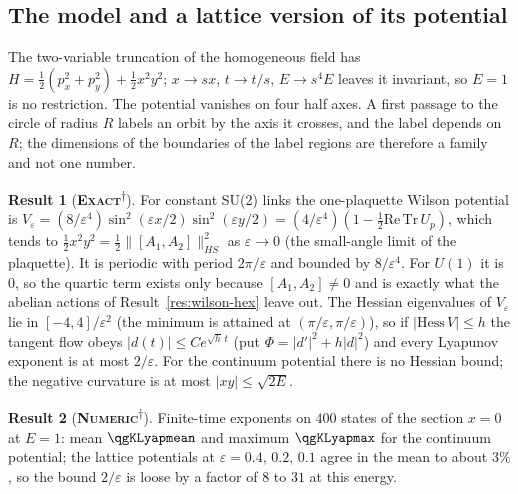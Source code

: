 \documentclass[11pt]{article}
\newcommand{\exact}{\textbf{\textsc{Exact}}}
\newcommand{\numeric}{\textbf{\textsc{Numeric}}}
\newcommand{\snap}{\textsuperscript{$\dagger$}}      %
\theoremstyle{definition}
\newtheorem{result}{Result}
\begin{document}
\subsection{The model and a lattice version of its potential}\label{sec:ym-model}
The two-variable truncation of the homogeneous field has $H=\tfrac12(p_x^2+p_y^2)+\tfrac12x^2y^2$; $x\to sx$, $t\to t/s$, $E\to s^4E$ leaves it invariant, so $E=1$ is no restriction. The potential vanishes on four half axes. A first passage to the circle of radius $R$ labels an orbit by the axis it crosses, and the label depends on $R$; the dimensions of the boundaries of the label regions are therefore a family and not one number.
\begin{result}[\exact\snap]\label{res:ym-wilson}
For constant SU(2) links the one-plaquette Wilson potential is $V_\varepsilon=(8/\varepsilon^4)\sin^2(\varepsilon x/2)\sin^2(\varepsilon y/2)=(4/\varepsilon^4)(1-\tfrac12\mathrm{Re\,Tr}\,U_p)$, which tends to $\tfrac12x^2y^2=\tfrac12\|[A_1,A_2]\|^2_{HS}$ as $\varepsilon\to0$ (the small-angle limit of the plaquette). It is periodic with period $2\pi/\varepsilon$ and bounded by $8/\varepsilon^4$. For $U(1)$ it is $0$, so the quartic term exists only because $[A_1,A_2]\neq0$ and is exactly what the abelian actions of Result~\ref{res:wilson-hex} leave out. The Hessian eigenvalues of $V_\varepsilon$ lie in $[-4,4]/\varepsilon^2$ (the minimum is attained at $(\pi/\varepsilon,\pi/\varepsilon)$), so if $|\mathrm{Hess}\,V|\le h$ the tangent flow obeys $|d(t)|\le C e^{\sqrt h\,t}$ (put $\Phi=|d'|^2+h|d|^2$) and every Lyapunov exponent is at most $2/\varepsilon$. For the continuum potential there is no Hessian bound; the negative curvature is at most $|xy|\le\sqrt{2E}$.
\end{result}
\begin{result}[\numeric\snap]\label{res:ym-lyap}
Finite-time exponents on $400$ states of the section $x=0$ at $E=1$: mean $\qgKLyapmean$ and maximum $\qgKLyapmax$ for the continuum potential; the lattice potentials at $\varepsilon=0.4,\,0.2,\,0.1$ agree in the mean to about $3\%$, so the bound $2/\varepsilon$ is loose by a factor of $8$ to $31$ at this energy.
\end{result}
\end{document}
